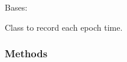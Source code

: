 \documentclass[letterpaper,10pt,english]{sphinxmanual}
\begin{document}
\begin{fulllineitems}
\label{\detokenize{utils/callbacks:utils.callbacks.TimeHistory}}
Bases: 

Class to record each epoch time.
\subsubsection*{Methods}


\begin{savenotes}\sphinxatlongtablestart\begin{longtable}[c]{}
\hline

\endfirsthead

%
{}\\
\hline

\endhead

\hline
{}\\
\endfoot

\endlastfoot


\end{longtable}
\end{savenotes}
\end{fulllineitems}
\end{document}
